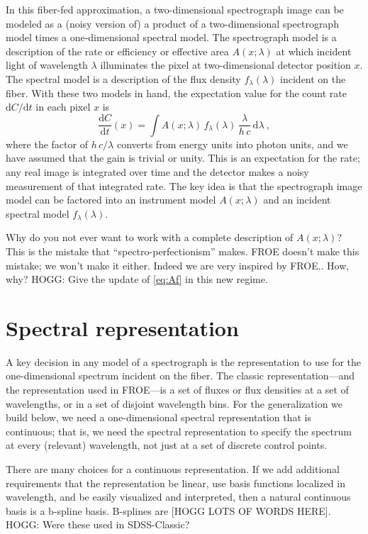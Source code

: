 \documentclass[modern]{aastex631}
\newcommand{\dd}{\mathrm{d}}
\begin{document}
In this fiber-fed approximation, a two-dimensional spectrograph image can be modeled as a (noisy version of) a product of a two-dimensional spectrograph model times a one-dimensional spectral model.
The spectrograph model is a description of the rate or efficiency or effective area $A(x;\lambda)$ at which incident light of wavelength $\lambda$ illuminates the pixel at two-dimensional detector position $x$.
The spectral model is a description of the flux density $f_\lambda(\lambda)$ incident on the fiber.
With these two models in hand, the expectation value for the count rate $\dd C/\dd t$ in each pixel $x$ is
\begin{equation}\label{eq:Af}
    \frac{\dd C}{\dd t}(x) = \int A(x;\lambda)\,f_\lambda(\lambda)\,\frac{\lambda}{h\,c}\,\dd\lambda ~,
\end{equation}
where the factor of $h\,c/\lambda$ converts from energy units into photon units, and we have assumed that the gain is trivial or unity.
This is an expectation for the rate; any real image is integrated over time and the detector makes a noisy measurement of that integrated rate.
The key idea is that the spectrograph image model can be factored into an instrument model $A(x;\lambda)$ and an incident spectral model $f_\lambda(\lambda)$.

Why do you not ever want to work with a complete description of $A(x;\lambda)$?
This is the mistake that ``spectro-perfectionism'' \cite{sp} makes.
FROE doesn't make this mistake; we won't make it either.
Indeed we are very inspired by FROE.. How, why?
HOGG: Give the update of \eqref{eq:Af} in this new regime.

\section{Spectral representation}

A key decision in any model of a spectrograph is the representation to use for the one-dimensional spectrum incident on the fiber.
The classic representation---and the representation used in FROE---is a set of fluxes or flux densities at a set of wavelengths, or in a set of disjoint wavelength bins.
For the generalization we build below, we need a one-dimensional spectral representation that is continuous; that is, we need the spectral representation to specify the spectrum at every (relevant) wavelength, not just at a set of discrete control points.

There are many choices for a continuous representation.
If we add additional requirements that the representation be linear, use basis functions localized in wavelength, and be easily visualized and interpreted, then a natural continuous basis is a b-spline basis.
B-splines are [HOGG LOTS OF WORDS HERE].
HOGG: Were these used in SDSS-Classic?
\end{document}
